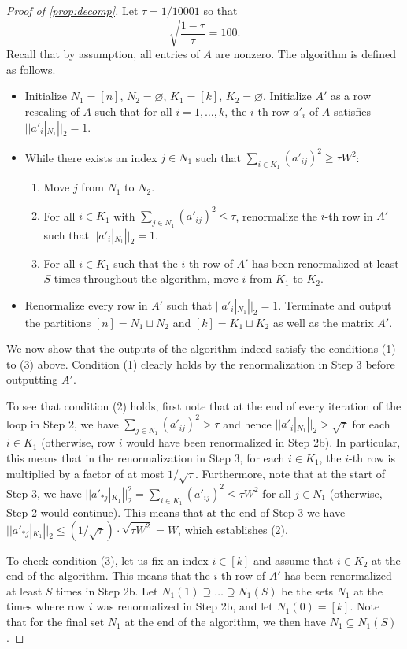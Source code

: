 \documentclass[reqno]{amsart}
\theoremstyle{remark}
\theoremstyle{definition}
\numberwithin{theorem}{section}
\renewcommand{\(}{\bigl(}
\renewcommand{\)}{\bigr)\vphantom{)}}
\renewcommand{\le}{\leqslant}
\renewcommand{\ge}{\geqslant}
\begin{document}
\begin{proof}[Proof of \cref{prop:decomp}]
    Let $\tau = 1/10001$ so that 
    \[\sqrt{\frac{1-\tau}{\tau}} = 100.\]
    Recall that by assumption, all entries of $A$ are nonzero. The algorithm is defined as follows.
    \begin{itemize}
        \item[1.] Initialize $N_1 = [n]$, $N_2 = \varnothing$, $K_1 = [k]$, $K_2 = \varnothing$. Initialize $A'$ as a row rescaling of $A$ such that for all $i=1,\dots,k$, the $i$-th row  $a'_i$ of $A$ satisfies $||a'_i|_{N_1}||_2 = 1$.
        \item[2.] While there exists an index $j\in N_1$ such that $\sum_{i\in K_1}(a'_{ij})^2\ge \tau W^2$:
        \begin{enumerate}
            \item[a.] Move $j$ from $N_1$ to $N_2$.
            \item[b.] For all $i\in K_1$ with $\sum_{j\in N_1}(a'_{ij})^2\le \tau$, renormalize the $i$-th row in $A'$ such that $||a'_i|_{N_1}||_2 = 1$.
            \item[c.] For all $i\in K_1$ such that the $i$-th row of $A'$ has been renormalized at least $S$ times throughout the algorithm, move $i$ from $K_1$ to $K_2$. 
        \end{enumerate}
        \item[3.] Renormalize every row in $A'$ such that $||a'_i|_{N_1}||_2 = 1$. Terminate and output the partitions $[n] = N_1\sqcup N_2$ and $[k] = K_1\sqcup K_2$ as well as the matrix $A'$.
    \end{itemize}
    We now show that the outputs of the algorithm indeed satisfy the conditions (1) to (3) above. Condition (1) clearly holds by the renormalization in Step 3 before outputting $A'$. 
    
    To see that condition (2) holds, first note that at the end of every iteration of the loop in Step 2, we have $\sum_{j\in N_1}(a'_{ij})^2> \tau$ and hence $||a'_i|_{N_1}||_2 >\sqrt{\tau}$ for each $i\in K_1$ (otherwise, row $i$ would have been renormalized in Step 2b). In particular, this means that in the renormalization in Step 3, for each $i\in K_1$, the $i$-th row is multiplied by a factor of at most $1/\sqrt{\tau}$. Furthermore, note that at the start of Step 3, we have $||a'_{*j}|_{K_1}||_2^2=\sum_{i\in K_1}(a'_{ij})^2\le \tau W^2$ for all $j\in N_1$ (otherwise, Step 2 would continue). This means that at the end of Step 3 we have $||a'_{*j}|_{K_1}||_2\le (1/\sqrt{\tau})\cdot \sqrt{\tau W^2}=W$, which establishes (2).

    To check condition (3), let us fix an index $i\in [k]$ and assume that $i\in K_2$ at the end of the algorithm. This means that the $i$-th row of $A'$ has been renormalized at least $S$ times in Step 2b. Let $N_1(1)\supseteq \dots \supseteq N_1(S)$ be the sets $N_1$ at the times where row $i$ was renormalized in Step 2b, and let $N_1(0)=[k]$. Note that for the final set $N_1$ at the end of the algorithm, we then have $N_1\subseteq N_1(S)$.
    

\end{proof}
\end{document}
